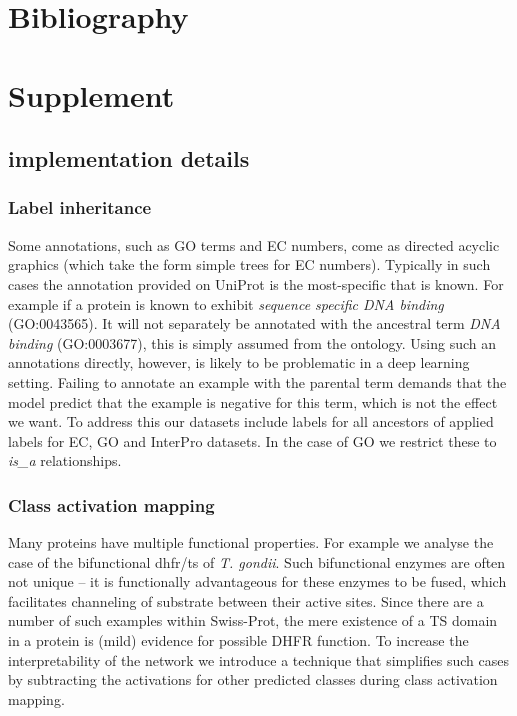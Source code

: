\section*{Bibliography}

\onecolumn
\newpage


\section*{Supplement}
\beginsupplement

\subsection{implementation details}

\subsubsection*{Label inheritance}
Some annotations, such as GO terms and EC numbers, come as directed acyclic graphics (which take the form simple trees for EC numbers). Typically in such cases the annotation provided on UniProt is the most-specific that is known. For example if a protein is known to exhibit \textit{sequence specific DNA binding} (GO:0043565). It will not separately be annotated with the ancestral term \textit{DNA binding} (GO:0003677), this is simply assumed from the ontology. Using such an annotations directly, however, is likely to be problematic in a deep learning setting. Failing to annotate an example with the parental term demands that the model predict that the example is negative for this term, which is not the effect we want.
To address this our datasets include labels for all ancestors of applied labels for EC, GO and InterPro datasets. In the case of GO we restrict these to \textit{is\_a} relationships.

\subsubsection*{Class activation mapping}
Many proteins have multiple functional properties. For example we analyse the case of the bifunctional dhfr/ts of \textit{T. gondii}. Such bifunctional enzymes are often not unique -- it is functionally advantageous for these enzymes to be fused, which facilitates channeling of substrate between their active sites. Since there are a number of such examples within Swiss-Prot, the mere existence of a TS domain in a protein is (mild) evidence for possible DHFR function. To increase the interpretability of the network we introduce a technique that simplifies such cases by subtracting the activations for other predicted classes during class activation mapping. 


